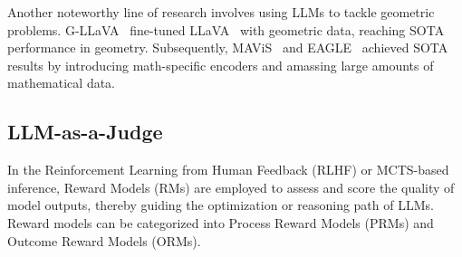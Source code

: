 Another noteworthy line of research involves using LLMs to tackle geometric problems. G-LLaVA~\cite{gao2023g} fine-tuned LLaVA~\cite{llava} with geometric data, reaching SOTA performance in geometry. Subsequently, MAViS~\cite{zhang2024mavis} and EAGLE~\cite{li2024eagle} achieved SOTA results by introducing math-specific encoders and amassing large amounts of mathematical data.




\subsection{LLM-as-a-Judge}
In the Reinforcement Learning from Human Feedback (RLHF) or MCTS-based inference, Reward Models (RMs) are employed to assess and score the quality of model outputs, thereby guiding the optimization or reasoning path of LLMs. Reward models can be categorized into Process Reward Models (PRMs) and Outcome Reward Models (ORMs).

